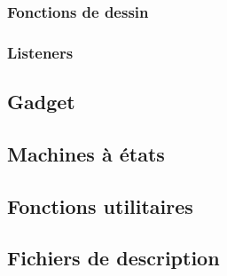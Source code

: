 \documentclass[a4paper]{article}
\begin{document}
\subsubsection{Fonctions de dessin}
\subsubsection{Listeners\label{listeners}}
\subsection{Gadget}
\subsection{Machines à états\label{statemachine}}
\subsection{Fonctions utilitaires}
\subsection{Fichiers de description}
\end{document}
